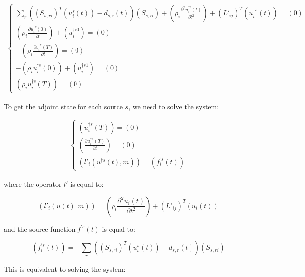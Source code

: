 \documentclass{article}
\begin{document}
\begin{align}
	\begin{cases}
		\sum_r \left( \left( S_{s, r i} \right) ^{T} \left( u_i^s (t) \right) - d_{s, r} (t) \right) \left( S_{s, r i} \right) + \left( \rho_i \frac{\partial ^2 u_i^{\dagger s} (t) }{\partial t^2} \right) + \left( L'_{ij} \right) ^{T} \left( u_i^{\dagger s} (t) \right) = \left( 0 \right) \\
		\left( \rho_i \frac{\partial u_i^{\dagger s} (0)}{\partial t} \right) + \left( u_i^{\dagger s 0} \right) = \left( 0 \right) \\ 
		- \left( \rho_i \frac{\partial u_i^{\dagger s} (T)}{\partial t} \right) = \left( 0 \right) \\
		- \left( \rho_i u_i^{\dagger s} (0) \right) + \left( u_i^{\dagger s 1} \right) = \left( 0 \right) \\
		\left( \rho_i u_i^{\dagger s} (T) \right) = \left( 0 \right)
	\end{cases}
\end{align}

To get the adjoint state for each source $s$, we need to solve the system: 

\begin{align}
	\begin{cases}
		\left(u_i^{\dagger s} (T) \right) = \left( 0 \right) \\
		\left( \frac{\partial u_i^{\dagger s} (T)}{\partial t} \right) = \left( 0 \right) \\
		\left( l'_i (u^{\dagger s} (t), m) \right) = \left( f_i^{\prime s} (t) \right)
	\end{cases}
\end{align}

where the operator $l'$ is equal to:

\begin{equation}
	\left( l'_i (u (t), m) \right) = \left( \rho_i \frac{\partial ^2 u_i (t)}{\partial t^2} \right) + \left( L'_{ij} \right) ^{T} \left( u_i (t) \right)
\end{equation}

and the source function $f^{\prime s} (t)$ is equal to:

\begin{equation}
	\left( f_i^{\prime s} (t) \right) = - \sum_r \left( \left( S_{s, r i} \right) ^{T} \left( u_i^s (t) \right) - d_{s, r} (t) \right) \left( S_{s, r i} \right)
\end{equation}

This is equivalent to solving the system:
\end{document}
